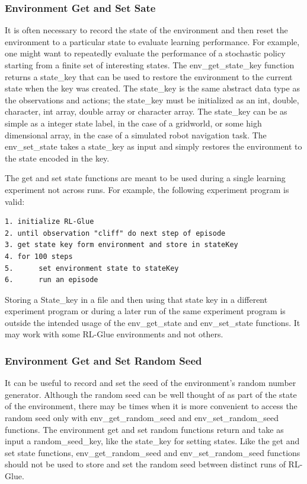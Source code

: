 \documentclass[11pt]{article}
\begin{document}
\subsubsection{Environment Get and Set Sate}
It is often necessary to record the state of the environment and then reset the environment to a particular state to evaluate learning performance. For example, one might want to repeatedly evaluate the performance of a stochastic policy starting from a finite set of interesting states. The env\_get\_state\_key function returns a state\_key that can be used to restore the environment to the current state when the key was created. The state\_key is the same abstract data type as the observations and actions; the state\_key must be initialized as an int, double, character, int array, double array or character array. The state\_key can be as simple as a integer state label, in the case of a gridworld, or some high dimensional array, in the case of a simulated robot navigation task.  The env\_set\_state takes a state\_key as input and simply restores the environment to the state encoded in the key. 

The get and set state functions are meant to be used during a single learning experiment not across runs. For example, the following experiment program is valid:
\begin{verbatim}
1. initialize RL-Glue
2. until observation "cliff" do next step of episode
3. get state key form environment and store in stateKey
4. for 100 steps
5.      set environment state to stateKey
6.      run an episode
\end{verbatim}
Storing a State\_key in a file and then using that state key in a different experiment program or during a later run of the same experiment program is outside the intended usage of the env\_get\_state and env\_set\_state functions. It may work with some RL-Glue environments and not others.
        
\subsubsection{Environment Get and Set Random Seed}
It can be useful to record and set the seed of the environment's random number generator. Although the random seed can be well thought of as part of the state of the environment, there may be times when it is more convenient to access the random seed only with env\_get\_random\_seed and env\_set\_random\_seed functions. The environment get and set random functions return and take as input a random\_seed\_key, like the state\_key for setting states. Like the get and set state functions, env\_get\_random\_seed and env\_set\_random\_seed functions should not be used to store and set the random seed between distinct runs of RL-Glue.
\end{document}
